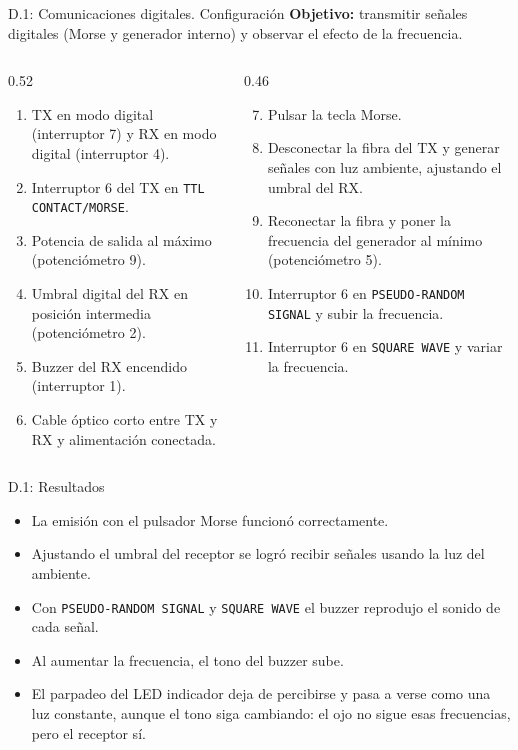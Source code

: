 \documentclass[aspectratio=169,10pt]{beamer}
\begin{document}
\begin{frame}{D.1: Comunicaciones digitales. Configuración}
  \textbf{Objetivo:} transmitir señales digitales (Morse y generador interno) y observar el efecto de la frecuencia.

  \medskip
  \small
  \begin{columns}[T]
    \begin{column}{0.52\textwidth}
      \begin{enumerate}
        \item TX en {modo digital} (interruptor 7) y RX en modo digital (interruptor 4).
        \item Interruptor 6 del TX en \texttt{TTL CONTACT/MORSE}.
        \item Potencia de salida al máximo (potenciómetro 9).
        \item Umbral digital del RX en posición intermedia (potenciómetro 2).
        \item Buzzer del RX encendido (interruptor 1).
        \item Cable óptico corto entre TX y RX y alimentación conectada.
      \end{enumerate}
    \end{column}
    \begin{column}{0.46\textwidth}
      \begin{enumerate}
        \setcounter{enumi}{6}
        \item Pulsar la tecla Morse.
        \item Desconectar la fibra del TX y generar señales con {luz ambiente}, ajustando el umbral del RX.
        \item Reconectar la fibra y poner la frecuencia del generador al mínimo (potenciómetro 5).
        \item Interruptor 6 en \texttt{PSEUDO-RANDOM SIGNAL} y subir la frecuencia.
        \item Interruptor 6 en \texttt{SQUARE WAVE} y variar la frecuencia.
      \end{enumerate}
    \end{column}
  \end{columns}
\end{frame}

\begin{frame}{D.1: Resultados}
  \begin{itemize}
    \item La emisión con el pulsador {Morse} funcionó correctamente.
    \item Ajustando el {umbral} del receptor se logró recibir señales usando la luz del ambiente.
    \item Con \texttt{PSEUDO-RANDOM SIGNAL} y \texttt{SQUARE WAVE} el buzzer reprodujo el sonido de cada señal.
    \item Al {aumentar la frecuencia}, el tono del buzzer sube.
    \item El parpadeo del LED indicador deja de percibirse y pasa a verse como una {luz constante}, aunque el tono siga cambiando: el ojo no sigue esas frecuencias, pero el receptor sí.
  \end{itemize}
\end{frame}
\end{document}
